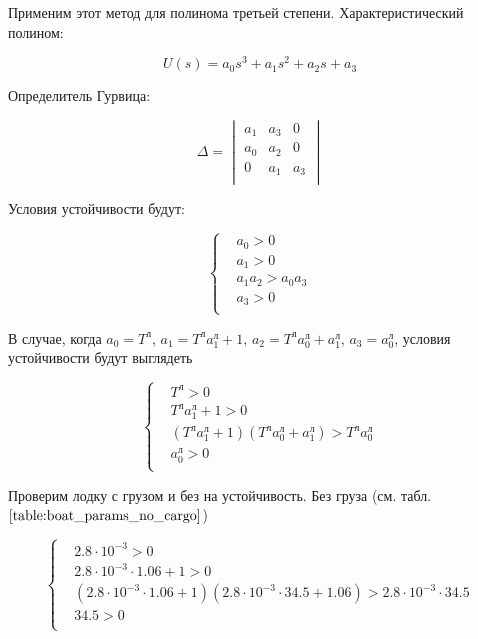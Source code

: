 \documentclass[a4paper]{article}
\begin{document}
Применим этот метод для полинома третьей степени. Характеристический полином:

$$ U(s) = a_0s^3 + a_1s^2 + a_2s + a_3 $$

Определитель Гурвица:

\begin{equation*}
	\Delta = 
	\begin{vmatrix}
		a_1 & a_3 & 0 \\
		a_0 & a_2 & 0 \\
		0 & a_1 & a_3 \\
	\end{vmatrix}
\end{equation*}

Условия устойчивости будут:

\begin{equation*}
	\begin{cases}
		&a_0 > 0 \\
		&a_1 > 0 \\
		&a_1a_2 > a_0a_3 \\
		&a_3 > 0 \\
	\end{cases}
\end{equation*}

В случае, когда $a_0 = T^\text{л}$, $a_1 = T^\text{л} a_1^\text{л} + 1$, $a_2 = T^\text{л} a_0^\text{л} + a_1^\text{л}$, $a_3 = a_0^\text{л}$, условия устойчивости будут выглядеть

\begin{equation*}
	\begin{cases}
		&T^\text{л} > 0 \\
		&T^\text{л}a_1^\text{л} + 1 > 0 \\
		&(T^\text{л}a_1^\text{л} + 1)(T^\text{л}a_0^\text{л} + a_1^\text{л}) > T^\text{л}a_0^\text{л} \\
		&a_0^\text{л} > 0 \\
	\end{cases}
\end{equation*}

Проверим лодку с грузом и без на устойчивость. Без груза (см. табл. $\ref{table:boat_params_no_cargo}$)

\begin{equation*}
	\begin{cases}
		&2.8 \cdot 10^{-3} > 0 \\
		&2.8 \cdot 10^{-3} \cdot 1.06 + 1 > 0 \\
		& (2.8 \cdot 10^{-3} \cdot 1.06 + 1)(2.8 \cdot 10^{-3} \cdot 34.5 + 1.06) > 2.8 \cdot 10^{-3} \cdot 34.5 \\
		&34.5 > 0 \\
	\end{cases}
\end{equation*}
\end{document}
